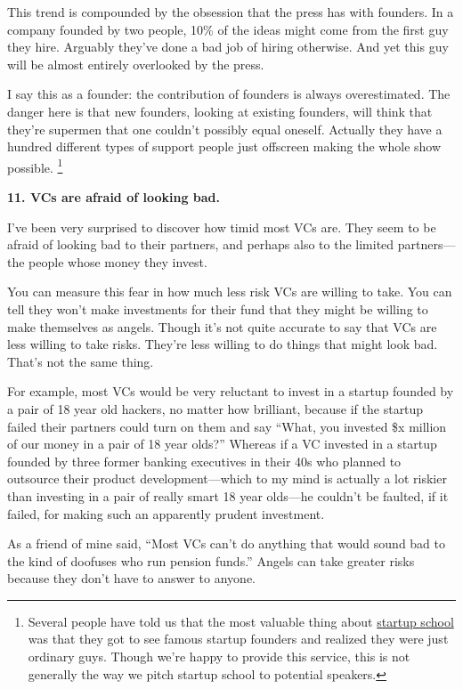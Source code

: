This trend is compounded by the obsession that the press has with
founders. In a company founded by two people, 10\% of the ideas might
come from the first guy they hire. Arguably they've done a bad job of
hiring otherwise. And yet this guy will be almost entirely overlooked by
the press.

I say this as a founder: the contribution of founders is always
overestimated. The danger here is that new founders, looking at existing
founders, will think that they're supermen that one couldn't possibly
equal oneself. Actually they have a hundred different types of support
people just offscreen making the whole show possible.
\footnote{Several people have told us that the most valuable thing about
\href{http://startupschool.org}{startup school} was that they got to see
famous startup founders and realized they were just ordinary guys.
Though we're happy to provide this service, this is not generally the
way we pitch startup school to potential speakers.}

\textbf{11. VCs are afraid of looking bad.}

I've been very surprised to discover how timid most VCs are. They seem
to be afraid of looking bad to their partners, and perhaps also to the
limited partners---the people whose money they invest.

You can measure this fear in how much less risk VCs are willing to take.
You can tell they won't make investments for their fund that they might
be willing to make themselves as angels. Though it's not quite accurate
to say that VCs are less willing to take risks. They're less willing to
do things that might look bad. That's not the same thing.

For example, most VCs would be very reluctant to invest in a startup
founded by a pair of 18 year old hackers, no matter how brilliant,
because if the startup failed their partners could turn on them and say
``What, you invested \$x million of our money in a pair of 18 year
olds?'' Whereas if a VC invested in a startup founded by three former
banking executives in their 40s who planned to outsource their product
development---which to my mind is actually a lot riskier than investing
in a pair of really smart 18 year olds---he couldn't be faulted, if it
failed, for making such an apparently prudent investment.

As a friend of mine said, ``Most VCs can't do anything that would sound
bad to the kind of doofuses who run pension funds.'' Angels can take
greater risks because they don't have to answer to anyone.

